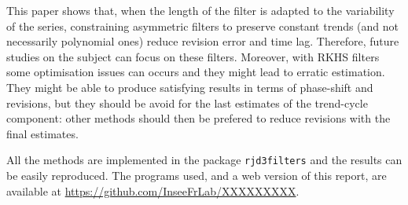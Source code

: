 This paper shows that, when the length of the filter is adapted to the
variability of the series, constraining asymmetric filters to preserve
constant trends (and not necessarily polynomial ones) reduce revision
error and time lag. Therefore, future studies on the subject can focus
on these filters. Moreover, with RKHS filters some optimisation issues
can occurs and they might lead to erratic estimation. They might be able
to produce satisfying results in terms of phase-shift and revisions, but
they should be avoid for the last estimates of the trend-cycle
component: other methods should then be prefered to reduce revisions
with the final estimates.

All the methods are implemented in the  package
\texttt{rjd3filters} and the results can be easily reproduced. The
programs used, and a web version of this report, are available at
\url{https://github.com/InseeFrLab/XXXXXXXXX}.

\newpage
